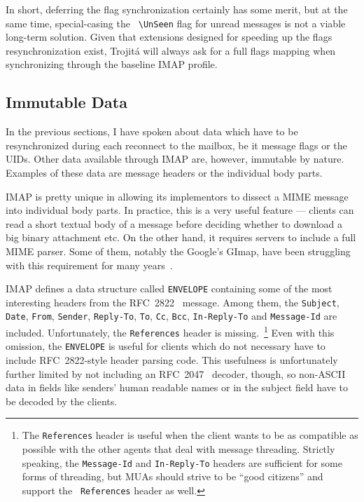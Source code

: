 \documentclass[trojita]{subfiles}
\begin{document}
In short, deferring the flag synchronization certainly has some merit, but at the same time, special-casing the {\tt
{\textbackslash}UnSeen} flag for unread messages is not a viable long-term solution.  Given that extensions designed for
speeding up the flags resynchronization exist, Trojitá will always ask for a full flags mapping when synchronizing
through the baseline IMAP profile.

\subsection{Immutable Data}
\label{sec:imap-immutable-data}

In the previous sections, I have spoken about data which have to be resynchronized during each reconnect to the mailbox,
be it message flags or the UIDs.  Other data available through IMAP are, however, immutable by nature.  Examples of
these data are message headers or the individual body parts.

IMAP is pretty unique in allowing its implementors to dissect a MIME message~\cite{rfc2045} into individual body parts.
In practice, this is a very useful feature --- clients can read a short textual body of a message before deciding whether
to download a big binary attachment etc.  On the other hand, it requires servers to include a full MIME parser.  Some of
them, notably the Google's GImap, have been struggling with this requirement for many
years~\cite{gmail-bodystructure-sucks}.

IMAP defines a data structure called {\tt ENVELOPE} containing some of the most interesting headers from the
RFC~2822~\cite{rfc2822} message.  Among them, the {\tt Subject}, {\tt Date}, {\tt From}, {\tt Sender}, {\tt Reply-To},
{\tt To}, {\tt Cc}, {\tt Bcc}, {\tt In-Reply-To} and {\tt Message-Id} are included.  Unfortunately, the {\tt References}
header is missing.~\footnote{The {\tt References} header is useful when the client wants to be as compatible as possible
with the other agents that deal with message threading.  Strictly speaking, the {\tt Message-Id} and {\tt In-Reply-To}
headers are sufficient for some forms of threading, but MUAs should strive to be ``good citizens'' and support the {\tt
References} header as well.}  Even with this omission, the {\tt ENVELOPE} is useful for clients which do not necessary
have to include RFC~2822-style header parsing code.  This usefulness is unfortunately further limited by not including
an RFC~2047~\cite{rfc2047} decoder, though, so non-ASCII data in fields like senders' human readable names or in the
subject field have to be decoded by the clients.
\end{document}
